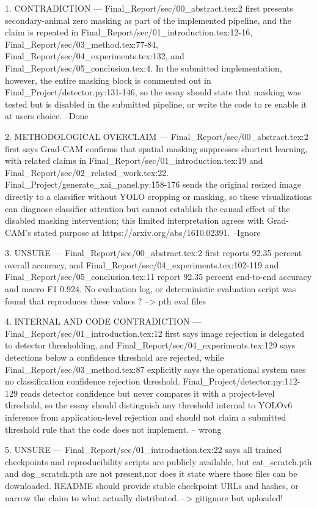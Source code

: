 
1. CONTRADICTION — Final_Report/sec/00_abstract.tex:2 first presents secondary-animal zero masking as part of the implemented pipeline, and the claim is repeated in Final_Report/sec/01_introduction.tex:12-16, Final_Report/sec/03_method.tex:77-84, Final_Report/sec/04_experiments.tex:132, and Final_Report/sec/05_conclusion.tex:4. In the submitted implementation, however, the entire masking block is commented out in Final_Project/detector.py:131-146, so the essay should state that masking was tested but is disabled in the submitted pipeline, or write the code to re enable it at users choice.
--Done

2. METHODOLOGICAL OVERCLAIM — Final_Report/sec/00_abstract.tex:2 first says Grad-CAM confirms that spatial masking suppresses shortcut learning, with related claims in Final_Report/sec/01_introduction.tex:19 and Final_Report/sec/02_related_work.tex:22. Final_Project/generate_xai_panel.py:158-176 sends the original resized image directly to a classifier without YOLO cropping or masking, so these visualizations can diagnose classifier attention but cannot establish the causal effect of the disabled masking intervention; this limited interpretation agrees with Grad-CAM's stated purpose at https://arxiv.org/abs/1610.02391.
--Ignore

3. UNSURE — Final_Report/sec/00_abstract.tex:2 first reports 92.35 percent overall accuracy, and Final_Report/sec/04_experiments.tex:102-119 and Final_Report/sec/05_conclusion.tex:11 report 92.35 percent end-to-end accuracy and macro F1 0.924. No evaluation log, or deterministic evaluation script was found that reproduces these values ?
--> pth eval files

4. INTERNAL AND CODE CONTRADICTION — Final_Report/sec/01_introduction.tex:12 first says image rejection is delegated to detector thresholding, and Final_Report/sec/04_experiments.tex:129 says detections below a confidence threshold are rejected, while Final_Report/sec/03_method.tex:87 explicitly says the operational system uses no classification confidence rejection threshold. Final_Project/detector.py:112-129 reads detector confidence but never compares it with a project-level threshold, so the essay should distinguish any threshold internal to YOLOv6 inference from application-level rejection and should not claim a submitted threshold rule that the code does not implement.
-- wrong


5. UNSURE — Final_Report/sec/01_introduction.tex:22 says all trained checkpoints and reproducibility scripts are publicly available, but  cat_scratch.pth and  dog_scratch.pth are not present,nor does it state where those files can be downloaded. README should provide stable checkpoint URLs and hashes, or narrow the claim to what actually distributed.
--> gitignore but uploaded!

